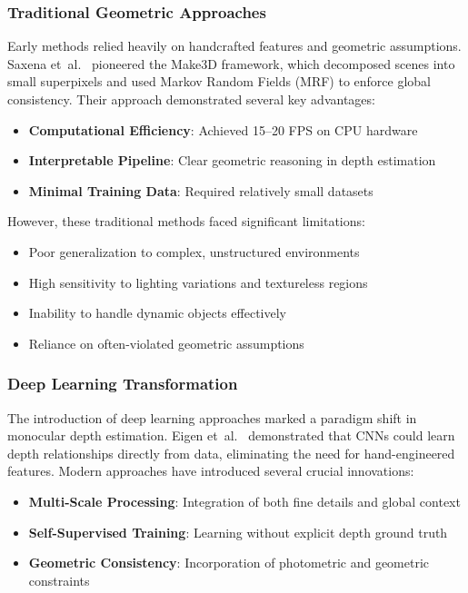 \documentclass[12pt,oneside]{book}
\begin{document}
\subsubsection{Traditional Geometric Approaches}
Early methods relied heavily on handcrafted features and geometric assumptions. Saxena et~al.~\cite{saxena2009make3d} pioneered the Make3D framework, which decomposed scenes into small superpixels and used Markov Random Fields (MRF) to enforce global consistency. Their approach demonstrated several key advantages:

\begin{itemize}
    \item \textbf{Computational Efficiency}: Achieved 15--20 FPS on CPU hardware
    \item \textbf{Interpretable Pipeline}: Clear geometric reasoning in depth estimation
    \item \textbf{Minimal Training Data}: Required relatively small datasets
\end{itemize}

However, these traditional methods faced significant limitations:
\begin{itemize}
    \item Poor generalization to complex, unstructured environments
    \item High sensitivity to lighting variations and textureless regions
    \item Inability to handle dynamic objects effectively
    \item Reliance on often-violated geometric assumptions
\end{itemize}

\subsubsection{Deep Learning Transformation}
The introduction of deep learning approaches marked a paradigm shift in monocular depth estimation. Eigen et~al.~\cite{eigen2014depth} demonstrated that CNNs could learn depth relationships directly from data, eliminating the need for hand-engineered features. Modern approaches have introduced several crucial innovations:

\begin{itemize}
    \item \textbf{Multi-Scale Processing}: Integration of both fine details and global context
    \item \textbf{Self-Supervised Training}: Learning without explicit depth ground truth
    \item \textbf{Geometric Consistency}: Incorporation of photometric and geometric constraints
\end{itemize}
\end{document}
